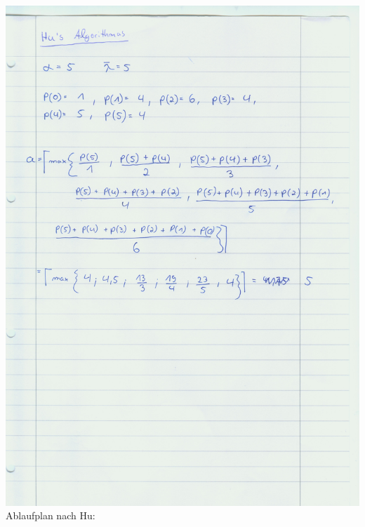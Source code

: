 \documentclass[a4paper]{scrartcl}
\begin{document}
\begin{enumerate}[(a)]
	\includegraphics[width=1\textwidth]{Image127}
	\newpage
	Ablaufplan nach Hu:
	

\end{enumerate}
\end{document}
